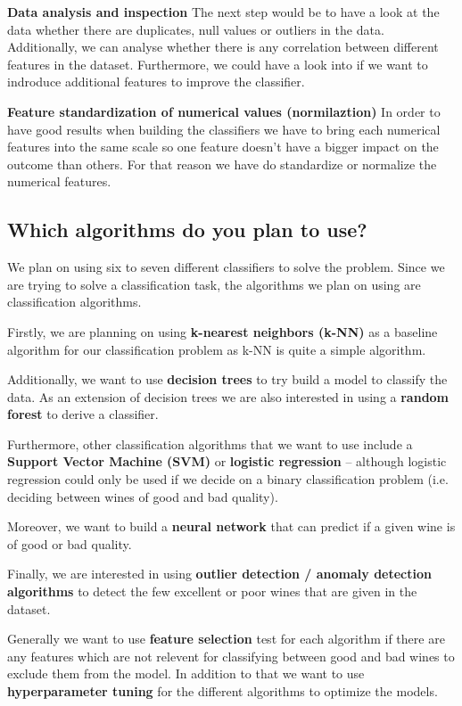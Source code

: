 \documentclass[11pt,titlepage,oneside,openany]{article}
\begin{document}
\textbf{Data analysis and inspection} The next step would be to have a look at the data whether there are duplicates, null values or outliers in the data. Additionally, we can analyse whether there is any correlation between different features in the dataset. Furthermore, we could have a look into if we want to indroduce additional features to improve the classifier.

\textbf{Feature standardization of numerical values (normilaztion)} In order to have good results when building the classifiers we have to bring each numerical features into the same scale so one feature doesn't have a bigger impact on the outcome than others. For that reason we have do standardize or normalize the numerical features.

\subsection{Which algorithms do you plan to use?}
We plan on using six to seven different classifiers to solve the problem. Since we 
are trying to solve a classification task, the algorithms we plan on using are classification
algorithms.

Firstly, we are planning on using \textbf{k-nearest neighbors (k-NN)} as a baseline
algorithm for our classification problem as k-NN is quite a simple algorithm.

Additionally, we want to use \textbf{decision trees} to try build a model to classify the
data. As an extension of decision trees we are also interested in using a \textbf{random forest}
to derive a classifier.

Furthermore, other classification algorithms that we want to use include a \textbf{Support Vector Machine (SVM)}
or \textbf{logistic regression} -- although logistic regression could only be used if we decide on
a binary classification problem (i.e. deciding between wines of good and bad quality).

Moreover, we want to build a \textbf{neural network} that can predict if a given wine is of good or bad quality.

Finally, we are interested in using \textbf{outlier detection / anomaly detection algorithms} to detect the few 
excellent or poor wines that are given in the dataset.

Generally we want to use \textbf{feature selection} test for each algorithm if there are any features which are not relevent 
for classifying between good and bad wines to exclude them from the model. In addition to that we want to use 
\textbf{hyperparameter tuning} for the different algorithms to optimize the models.
\end{document}
